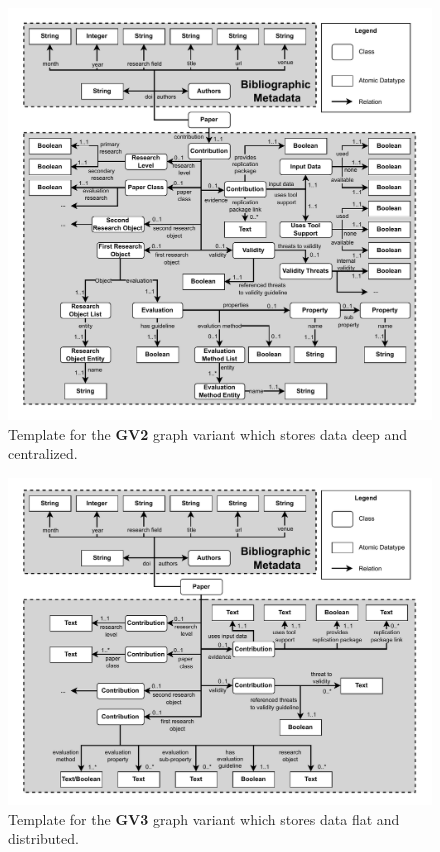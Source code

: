 \begin{figure}[H]
    \centering
    \includegraphics[width=0.90\linewidth]{figures/orkg/template_overview-deep_centralized.drawio.pdf}
    \caption[Template for Second Graph Variant]{Template for the \textbf{GV2} graph variant which stores data deep and centralized.}
\end{figure}

\begin{figure}[H]
    \centering
    \includegraphics[width=0.90\linewidth]{figures/orkg/template_overview-flat_distributed.drawio.pdf}
    \caption[Template for Third Graph Variant]{Template for the \textbf{GV3} graph variant which stores data flat and distributed.}
\end{figure}


